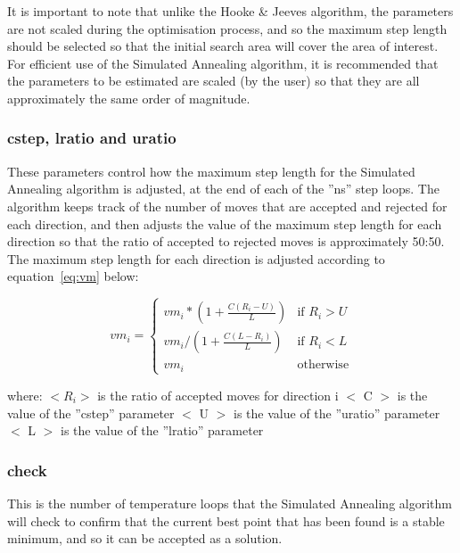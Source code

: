 \documentclass[10pt,twoside]{book}
\begin{document}
\bigskip
It is important to note that unlike the Hooke \& Jeeves algorithm, the parameters are not scaled during the optimisation process, and so the maximum step length should be selected so that the initial search area will cover the area of interest.  For efficient use of the Simulated Annealing algorithm, it is recommended that the parameters to be estimated are scaled (by the user) so that they are all approximately the same order of magnitude.

\subsubsection{cstep, lratio and uratio}
These parameters control how the maximum step length for the Simulated Annealing algorithm is adjusted, at the end of each of the ''ns'' step loops.  The algorithm keeps track of the number of moves that are accepted and rejected for each direction, and then adjusts the value of the maximum step length for each direction so that the ratio of accepted to rejected moves is approximately 50:50.  The maximum step length for each direction is adjusted according to equation~\ref{eq:vm} below:

\begin{equation}\label{eq:vm}
vm_{i} =
\begin{cases}
vm_{i} * (1 + \frac{C (R_{i} - U)}{L}) & \textrm{if $R_{i} > U$} \\
vm_{i} / (1 + \frac{C (L - R_{i})}{L}) & \textrm{if $R_{i} < L$} \\
vm_{i} & \textrm{otherwise}
\end{cases}
\end{equation}

where:\newline
$< R_{i} >$ is the ratio of accepted moves for direction i\newline
$<$ C $>$ is the value of the ''cstep'' parameter\newline
$<$ U $>$ is the value of the ''uratio'' parameter\newline
$<$ L $>$ is the value of the ''lratio'' parameter

\subsubsection{check}
This is the number of temperature loops that the Simulated Annealing algorithm will check to confirm that the current best point that has been found is a stable minimum, and so it can be accepted as a solution.
\end{document}
